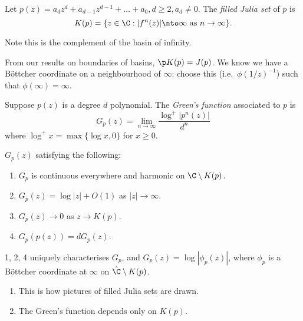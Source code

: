 \documentclass[a4paper]{article}
\begin{document}
\begin{definition}
  Let \(p(z) = a_dz^d + a_{d - 1}z^{d - 1} + \dots + a_0, d \geq 2, a_d \ne 0\). The \emph{filled Julia set} of \(p\) is
  \[
    K(p) = \{z \in \C: |f^n(z)| \nto \infty \text{ as } n \to \infty\}.
  \]
\end{definition}

Note this is the complement of the basin of infinity.

From our results on boundaries of basins, \(\p K(p) = J(p)\). We know we have a Böttcher coordinate on a neighbourhood of \(\infty\): choose this (i.e.\ \(\phi(1/z)^{-1}\)) such that \(\phi(\infty) = \infty\).

\begin{definition}
  Suppose \(p(z)\) is a degree \(d\) polynomial. The \emph{Green's function} associated to \(p\) is
  \[
    G_p(z) = \lim_{n \to \infty} \frac{\log^+ |p^n(z)|}{d^n}
  \]
  where \(\log^+x = \max\{\log x, 0\}\) for \(x \geq 0\).
\end{definition}

\begin{lemma}
  \(G_p(z)\) satisfying the following:
  \begin{enumerate}
  \item \(G_p\) is continuous everywhere and harmonic on \(\C \setminus K(p)\).
  \item \(G_p(z) = \log |z| + O(1)\) as \(|z| \to \infty\).
  \item \(G_p(z) \to 0\) as \(z \to K(p)\).
  \item \(G_p(p(z)) = d G_p(z)\).
  \end{enumerate}
  1, 2, 4 uniquely characterises \(G_p\), and \(G_p(z) = \log |\phi_p(z)|\), where \(\phi_p\) is a Böttcher coordinate at \(\infty\) on \(\hat \C \setminus K(p)\).
\end{lemma}

\begin{remark}\leavevmode
  \begin{enumerate}
  \item This is how pictures of filled Julia sets are drawn.
  \item The Green's function depends only on \(K(p)\).
  \end{enumerate}
\end{remark}
\end{document}
